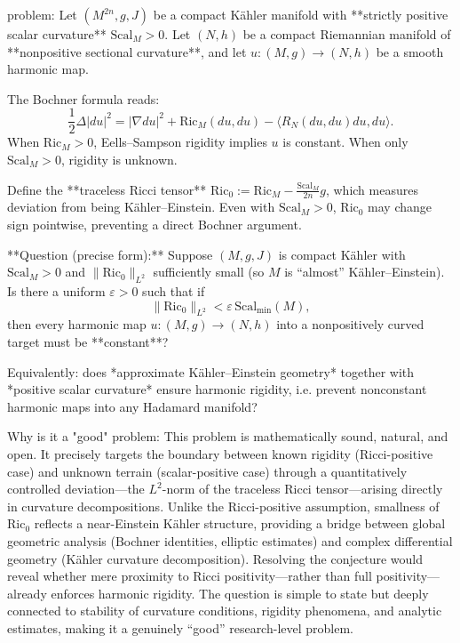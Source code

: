 problem:  
Let \((M^{2n}, g, J)\) be a compact Kähler manifold with **strictly positive scalar curvature** \(\mathrm{Scal}_M>0\).  
Let \((N,h)\) be a compact Riemannian manifold of **nonpositive sectional curvature**, and let \(u:(M,g)\to (N,h)\) be a smooth harmonic map.  

The Bochner formula reads:
\[
\frac{1}{2}\Delta |du|^2 = |\nabla du|^2 + \mathrm{Ric}_M(du,du) - \langle R_N(du,du)du,du\rangle.
\]
When \(\mathrm{Ric}_M>0\), Eells–Sampson rigidity implies \(u\) is constant.  
When only \(\mathrm{Scal}_M>0\), rigidity is unknown.  

Define the **traceless Ricci tensor** \(\mathrm{Ric}_0 := \mathrm{Ric}_M - \frac{\mathrm{Scal}_M}{2n} g\), which measures deviation from being Kähler–Einstein.  Even with \(\mathrm{Scal}_M>0\), \(\mathrm{Ric}_0\) may change sign pointwise, preventing a direct Bochner argument.

**Question (precise form):**  
Suppose \((M,g,J)\) is compact Kähler with \(\mathrm{Scal}_M>0\) and \(\|\mathrm{Ric}_0\|_{L^2}\) sufficiently small (so \(M\) is “almost” Kähler–Einstein).  
Is there a uniform \(\varepsilon > 0\) such that if 
\[
\|\mathrm{Ric}_0\|_{L^2} < \varepsilon\, \mathrm{Scal}_{\min}(M),
\]
then every harmonic map \(u:(M,g)\to(N,h)\) into a nonpositively curved target must be **constant**?

Equivalently: does *approximate Kähler–Einstein geometry* together with *positive scalar curvature* ensure harmonic rigidity, i.e. prevent nonconstant harmonic maps into any Hadamard manifold?

Why is it a "good" problem:  
This problem is mathematically sound, natural, and open. It precisely targets the boundary between known rigidity (Ricci-positive case) and unknown terrain (scalar-positive case) through a quantitatively controlled deviation—the \(L^2\)-norm of the traceless Ricci tensor—arising directly in curvature decompositions.  Unlike the Ricci-positive assumption, smallness of \(\mathrm{Ric}_0\) reflects a near-Einstein Kähler structure, providing a bridge between global geometric analysis (Bochner identities, elliptic estimates) and complex differential geometry (Kähler curvature decomposition). Resolving the conjecture would reveal whether mere proximity to Ricci positivity—rather than full positivity—already enforces harmonic rigidity. The question is simple to state but deeply connected to stability of curvature conditions, rigidity phenomena, and analytic estimates, making it a genuinely “good” research-level problem.